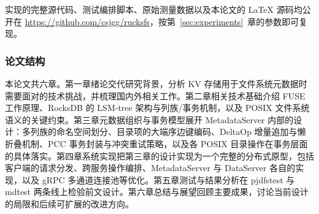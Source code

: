 实现的完整源代码、测试编排脚本、原始测量数据以及本论文的 LaTeX 源码均公开在 \url{https://github.com/csjgg/rucksfs}，按第~\ref{sec:experiments}~章的参数即可复现。

\subsubsection{论文结构}

本论文共六章。第一章绪论交代研究背景，分析 KV 存储用于文件系统元数据时需要面对的技术挑战，并梳理国内外相关工作。第二章相关技术基础介绍 FUSE 工作原理、RocksDB 的 LSM-tree 架构与列族/事务机制，以及 POSIX 文件系统语义的关键约束。第三章元数据组织与事务模型展开 MetadataServer 内部的设计：多列族的命名空间划分、目录项的大端序边键编码、DeltaOp 增量追加与懒折叠机制、PCC 事务封装与冲突重试策略，以及各 POSIX 目录操作在事务层面的具体落实。第四章系统实现把第三章的设计实现为一个完整的分布式原型，包括客户端的请求分发、跨服务操作编排、MetadataServer 与 DataServer 各自的实现，以及 gRPC 多通道连接池等优化。第五章测试与结果分析在 pjdfstest 与 mdtest 两条线上检验前文设计。第六章总结与展望回顾主要成果，讨论当前设计的局限和后续可扩展的改进方向。
